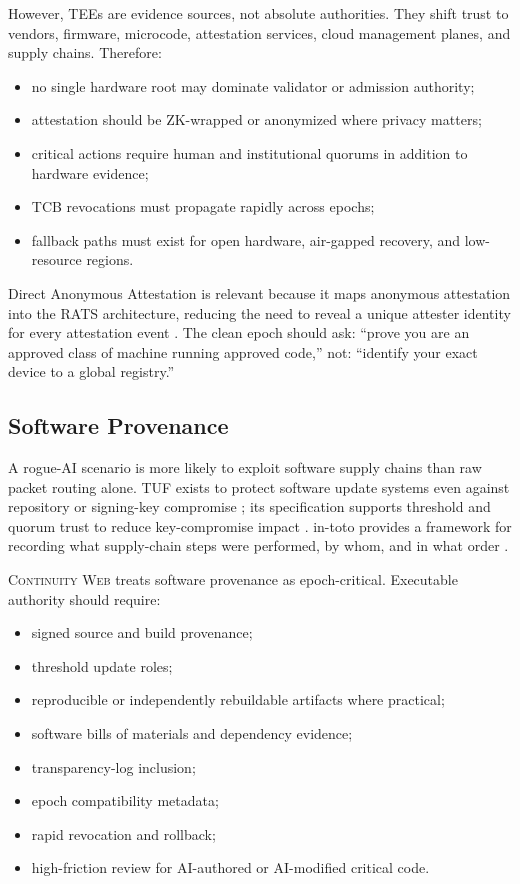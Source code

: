 \documentclass[11pt,letterpaper]{article}
\newcommand{\CW}{\textsc{Continuity Web}}
\begin{document}
However, TEEs are evidence sources, not absolute authorities. They shift trust to vendors, firmware, microcode, attestation services, cloud management planes, and supply chains. Therefore:

\begin{itemize}[leftmargin=1.4em]
\item no single hardware root may dominate validator or admission authority;
\item attestation should be ZK-wrapped or anonymized where privacy matters;
\item critical actions require human and institutional quorums in addition to hardware evidence;
\item TCB revocations must propagate rapidly across epochs;
\item fallback paths must exist for open hardware, air-gapped recovery, and low-resource regions.
\end{itemize}

Direct Anonymous Attestation is relevant because it maps anonymous attestation into the RATS architecture, reducing the need to reveal a unique attester identity for every attestation event \cite{rats_daa}. The clean epoch should ask: ``prove you are an approved class of machine running approved code,'' not: ``identify your exact device to a global registry.''

\subsection{Software Provenance}

A rogue-AI scenario is more likely to exploit software supply chains than raw packet routing alone. TUF exists to protect software update systems even against repository or signing-key compromise \cite{tuf}; its specification supports threshold and quorum trust to reduce key-compromise impact \cite{tuf_spec}. in-toto provides a framework for recording what supply-chain steps were performed, by whom, and in what order \cite{intoto}.

\CW{} treats software provenance as epoch-critical. Executable authority should require:

\begin{itemize}[leftmargin=1.4em]
\item signed source and build provenance;
\item threshold update roles;
\item reproducible or independently rebuildable artifacts where practical;
\item software bills of materials and dependency evidence;
\item transparency-log inclusion;
\item epoch compatibility metadata;
\item rapid revocation and rollback;
\item high-friction review for AI-authored or AI-modified critical code.
\end{itemize}
\end{document}
